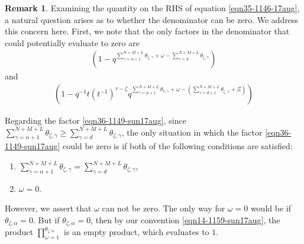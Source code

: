 \documentclass[12pt,reqno,a4paper]{amsart}
\numberwithin{equation}{section}
\theoremstyle{definition}
\newtheorem{rem}[thm]{Remark}
\begin{document}
\begin{rem}
Examining the quantity on the RHS of equation \eqref{eqn35-1146-17aug}, a natural question arises as to whether the denominator can be zero. We address this concern here. First, we note that the only factors in the denominator that could potentially evaluate to zero are 
\begin{align}
\left(	1 - q^{	\sum_{\gamma = \alpha + 1}^{N + M + L} \theta_{\zeta,\gamma}	+ \omega - \sum_{\gamma = d}^{N + M + L}\theta_{\zeta,\gamma} 		}			\right)
\label{eqn36-1149-sun17aug}
\end{align}
and
\begin{align}
\left(	1 - q^{-1}t			
(t^{-1})^{\tau - \zeta} q^{	\sum_{\gamma = p + 1}^{N + M + L} \theta_{\tau,\gamma}	+ \omega	- (\sum_{\gamma = d + 1}^{N + M + L} \theta_{\zeta,\gamma} + \Xi)		}
\right)
\label{eqn37-1200-sun17aug}
\end{align}

Regarding the factor \eqref{eqn36-1149-sun17aug}, since $\sum_{\gamma = \alpha + 1}^{N + M + L} \theta_{\zeta,\gamma} \geq \sum_{\gamma = d}^{N + M + L}\theta_{\zeta,\gamma}$, the only situation in which the factor \eqref{eqn36-1149-sun17aug} could be zero is if both of the following conditions are satisfied:
\begin{enumerate}[(1)]
	\item $\sum_{\gamma = \alpha + 1}^{N + M + L} \theta_{\zeta,\gamma} = \sum_{\gamma = d}^{N + M + L}\theta_{\zeta,\gamma}$,
	\item $\omega = 0$. 
\end{enumerate}
However, we assert that $\omega$ can not be zero. The only way for $\omega = 0$ would be if $\theta_{\zeta,\alpha} = 0$. But if $\theta_{\zeta,\alpha} = 0$, then by our convention \eqref{eqn14-1159-sun17aug}, the product $\prod_{\omega = 1}^{\theta_{\zeta,\alpha}}$ is an empty product, which evaluates to $1$.


\end{rem}
\end{document}
